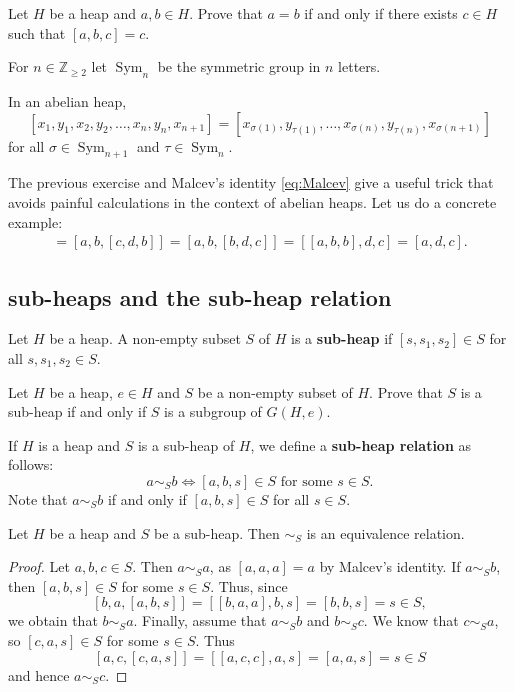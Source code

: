 \documentclass{svmult}
\newcommand{\Z}{\mathbb{Z}}
\newcommand{\Sym}{\operatorname{Sym}}
\begin{document}
\begin{exercise}
\label{xca:equality}
    Let $H$ be a heap and $a,b\in H$. Prove that
    $a=b$ if and only if there exists $c\in H$ such that 
    $[a,b,c]=c$.
\end{exercise}

For $n\in\Z_{\geq2}$ let 
$\Sym_n$ be the symmetric group in $n$ letters. 

\begin{exercise}
\label{xca:abelian}
    In an abelian heap,
    \[
    [x_1,y_1,x_2,y_2,\dots,x_n,y_n,x_{n+1}]=[x_{\sigma(1)},y_{\tau(1)},\dots,x_{\sigma(n)},y_{\tau(n)},x_{\sigma(n+1)}]
    \]
    for all $\sigma\in\Sym_{n+1}$ and $\tau\in\Sym_n$. 
\end{exercise}

The previous exercise and Malcev's identity \eqref{eq:Malcev}
give a useful trick that avoids painful calculations in the context of abelian heaps. 
Let us do a concrete example:
\begin{align*}
    [a,b,c,d,b]=[a,b,[c,d,b]]=[a,b,[b,d,c]]=[[a,b,b],d,c]=[a,d,c].
\end{align*}

\subsection{sub-heaps and the sub-heap relation}

\begin{definition}
    Let $H$ be a heap. 
    A non-empty subset $S$ of $H$ is a \textbf{sub-heap} if $[s,s_1,s_2]\in S$ for all 
    $s,s_1,s_2\in S$. 
\end{definition}

\begin{exercise}
    Let $H$ be a heap, $e\in H$ and $S$ be a non-empty subset of $H$. 
    Prove that $S$ is a sub-heap if and only if $S$ is a subgroup of $G(H,e)$. 
\end{exercise}

If $H$ is a heap and $S$ is a sub-heap of $H$, we define 
a \textbf{sub-heap relation} as follows:
\[
a\sim_S b\Longleftrightarrow [a,b,s]\in S\text{ for some $s\in S$}.
\]
Note that $a\sim_Sb$ if and only if $[a,b,s]\in S$ for all $s\in S$. 

\begin{proposition}
    Let $H$ be a heap and $S$ be a sub-heap. Then $\sim_S$ is an equivalence relation. 
\end{proposition}

\begin{proof}
    Let $a,b,c\in S$. Then $a\sim_S a$, as $[a,a,a]=a$ by Malcev's identity. 
    If $a\sim_S b$, then $[a,b,s]\in S$ for some $s\in S$. Thus, since 
    \[
    [b,a,[a,b,s]]=[[b,a,a],b,s]=[b,b,s]=s\in S,
    \]
    we obtain that $b\sim_S a$. 
    Finally, assume that $a\sim_S b$ and $b\sim_S c$. We know that 
    $c\sim_S a$, so 
    $[c,a,s]\in S$ for some $s\in S$. Thus 
    \[
    [a,c,[c,a,s]]=[[a,c,c],a,s]=[a,a,s]=s\in S
    \]
    and hence $a\sim_S c$. 
\end{proof}
\end{document}

